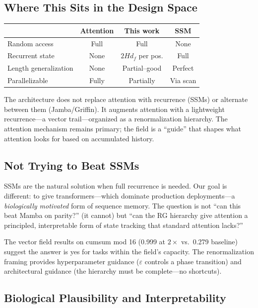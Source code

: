 \documentclass[11pt,a4paper]{article}
\newcommand{\evap}{\varepsilon}
\begin{document}
\subsection{Where This Sits in the Design Space}

\begin{center}
\begin{tabular}{@{}lccc@{}}
\toprule
& \textbf{Attention} & \textbf{This work} & \textbf{SSM} \\
\midrule
Random access & Full & Full & None \\
Recurrent state & None & $2Hd_f$ per pos. & Full \\
Length generalization & None & Partial--good & Perfect \\
Parallelizable & Fully & Partially & Via scan \\
\bottomrule
\end{tabular}
\end{center}

The architecture does not replace attention with recurrence (SSMs)
or alternate between them (Jamba/Griffin).  It augments attention
with a lightweight recurrence---a vector trail---organized as a
renormalization hierarchy.  The attention mechanism remains primary;
the field is a ``guide'' that shapes what attention looks for based
on accumulated history.

\subsection{Not Trying to Beat SSMs}

SSMs are the natural solution when full recurrence is needed.  Our
goal is different: to give transformers---which dominate production
deployments---a \emph{biologically motivated} form of sequence
memory.  The question is not ``can this beat Mamba on parity?'' (it
cannot) but ``can the RG hierarchy give attention a principled,
interpretable form of state tracking that standard attention lacks?''

The vector field results on cumsum mod 16 (0.999 at $2\times$ vs.\
0.279 baseline) suggest the answer is yes for tasks within the
field's capacity.  The renormalization framing provides hyperparameter
guidance ($\evap$ controls a phase transition) and architectural
guidance (the hierarchy must be complete---no shortcuts).

\subsection{Biological Plausibility and Interpretability}
\end{document}
